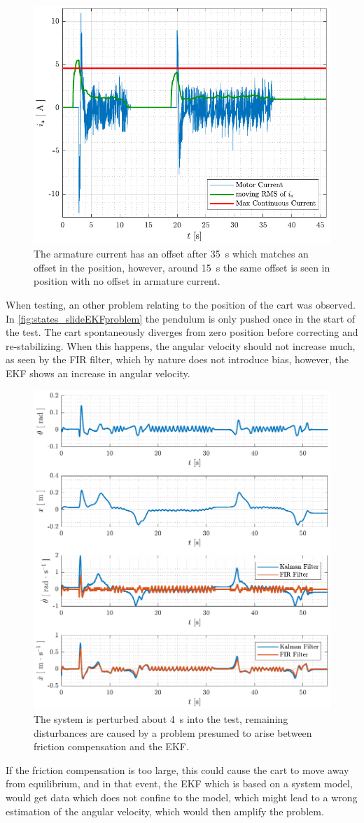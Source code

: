 \begin{figure}[H]
  \includegraphics[width=.42\textwidth]{figures/ia_slide}
  \caption{The armature current has an offset after \SI{35}{s} which matches an offset in the position, however, around \SI{15}{s} the same offset is seen in position with no offset in armature current.}
  \label{fig:ia_slide}
\end{figure}
%
When testing, an other problem relating to the position of the cart was observed. In \autoref{fig:states_slideEKFproblem} the pendulum is only pushed once in the start of the test. The cart spontaneously diverges from zero position before correcting and re-stabilizing. When this happens, the angular velocity should not increase much, as seen by the FIR filter, which by nature does not introduce bias, however, the EKF shows an increase in angular velocity.
%
\begin{figure}[H]
  \includegraphics[width=.68\textwidth]{figures/states_slideEKFproblem}
  \caption{The system is perturbed about \SI{4}{s} into the test, remaining disturbances are caused by a problem presumed to arise between friction compensation and the EKF.}
  \label{fig:states_slideEKFproblem}
\end{figure}
If the friction compensation is too large, this could cause the cart to move away from equilibrium, and in that event, the EKF which is based on a system model, would get data which does not confine to the model, which might lead to a wrong estimation of the angular velocity, which would then amplify the problem.
%

